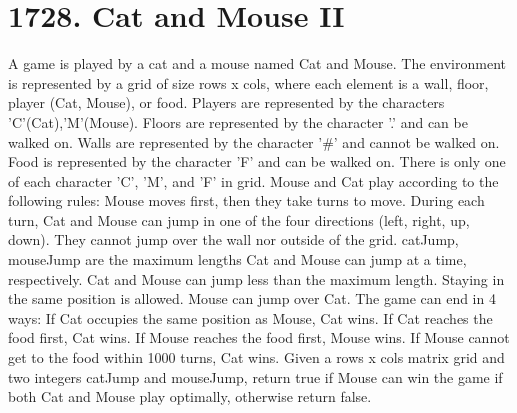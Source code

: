 \documentclass[9pt, b5paaper]{book}
\begin{document}
\section{1728. Cat and Mouse II}
\label{sec-2-20}
A game is played by a cat and a mouse named Cat and Mouse.
The environment is represented by a grid of size rows x cols, where each element is a wall, floor, player (Cat, Mouse), or food.
Players are represented by the characters 'C'(Cat),'M'(Mouse).
Floors are represented by the character '.' and can be walked on.
Walls are represented by the character '\#' and cannot be walked on.
Food is represented by the character 'F' and can be walked on.
There is only one of each character 'C', 'M', and 'F' in grid.
Mouse and Cat play according to the following rules:
Mouse moves first, then they take turns to move.
During each turn, Cat and Mouse can jump in one of the four directions (left, right, up, down). They cannot jump over the wall nor outside of the grid.
catJump, mouseJump are the maximum lengths Cat and Mouse can jump at a time, respectively. Cat and Mouse can jump less than the maximum length.
Staying in the same position is allowed.
Mouse can jump over Cat.
The game can end in 4 ways:
If Cat occupies the same position as Mouse, Cat wins.
If Cat reaches the food first, Cat wins.
If Mouse reaches the food first, Mouse wins.
If Mouse cannot get to the food within 1000 turns, Cat wins.
Given a rows x cols matrix grid and two integers catJump and mouseJump, return true if Mouse can win the game if both Cat and Mouse play optimally, otherwise return false.
\end{document}
